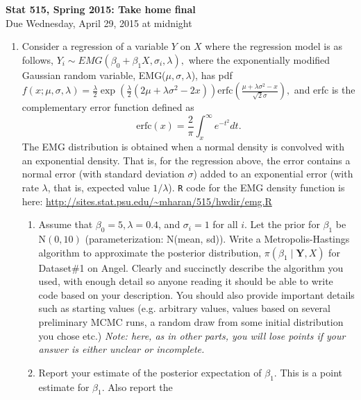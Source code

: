 \documentclass[11pt]{article}
\begin{document}
\begin{center}
\Large
{\bf  Stat 515, Spring 2015: Take home final}\\
Due Wednesday, April 29, 2015 at midnight\\
\normalsize
\end{center}
\begin{enumerate}
\item Consider a regression of a variable $Y$ on $X$ where the regression model is as follows,
$Y_i \sim EMG(\beta_0 + \beta_1X, \sigma_i, \lambda),$ 
where the exponentially modified Gaussian random variable, EMG($\mu, \sigma, \lambda$), has pdf
$f(x;\mu, \sigma, \lambda) = \frac{\lambda}{2} \exp(\frac{\lambda}{2} (2\mu + \lambda\sigma^2 - 2x)) \mbox{erfc}\left(\frac{\mu + \lambda\sigma^2 - x}{\sqrt{2} \sigma} \right), $
and erfc is the complementary error function defined as
$$\mbox{erfc}(x) = \frac{2}{\pi} \int_x^{\infty} e^{-t^2} dt.$$
The EMG distribution is obtained when a normal density is convolved
with an exponential density. That is, for the regression above, the
error contains a normal error (with standard deviation $\sigma$) added
to an exponential error (with rate $\lambda$, that is, expected value
$1/\lambda$). {\tt R} code for the EMG density function is here: \url{http://sites.stat.psu.edu/~mharan/515/hwdir/emg.R}
\begin{enumerate}
\item Assume that $\beta_0=5, \lambda=0.4$, and $\sigma_i=1 $ for all
  $i$. Let the prior for $\beta_1$ be N$(0,10)$ (parameterization:
  N(mean, sd)). Write a Metropolis-Hastings algorithm to approximate
  the posterior distribution, $\pi(\beta_1\mid {\mathbf Y, X})$ for
  Dataset\#1 on Angel. Clearly and succinctly describe the algorithm
  you used, with enough detail so anyone reading it should be able to
  write code based on your description. You should also provide
  important details such as starting values (e.g. arbitrary values,
  values based on several preliminary MCMC runs, a random draw from
  some initial distribution you chose etc.) {\it Note: here, as in
    other parts, you will lose points if your answer is either unclear
    or incomplete.}
\item Report your estimate of the posterior expectation of
  $\beta_1$. This is a point estimate for $\beta_1$. Also report the

\end{enumerate}
\end{enumerate}
\end{document}
